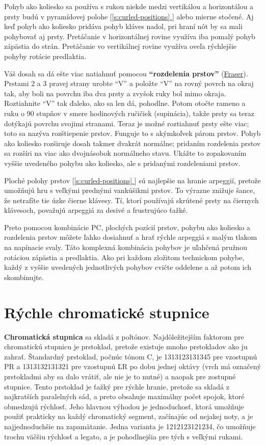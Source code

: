 \documentclass[11pt,a4paper]{book}
\newcommand*{\fullref}[1]{\hyperref[{#1}]{\ref*{#1} \nameref*{#1}}} %
\newcommand*{\fullrefp}[1]{[\fullref{#1}]} %
\begin{document}
Pohyb ako koliesko sa používa s rukou niekde medzi vertikálou a horizontálou a prsty budú v pyramídovej polohe \fullrefp{s:curled-positions} alebo mierne stočené. Aj keď pohyb ako koliesko pridáva pohyb kláves nadol, pri hraní nôt by sa mali pohybovať aj prsty. Pretáčanie v horizontálnej rovine využíva iba pomalý pohyb zápästia do strán. Pretáčanie vo vertikálnej rovine využíva oveľa rýchlejšie pohyby rotácie predlaktia.

Váš dosah sa dá ešte viac natiahnuť pomocou \textbf{“rozdelenia prstov”} (\hyperlink{r:fraser}{Fraser}). Prstami 2 a 3 pravej strany urobte “V” a položte “V” na rovný povrch na okraj tak, aby boli na povrchu iba dva prsty a zvyšok ruky bol mimo okraja. Roztiahnite “V” tak ďaleko, ako sa len dá, pohodlne. Potom otočte rameno a ruku o 90 stupňov v smere hodinových ručičiek (supinácia), takže prsty sa teraz dotýkajú povrchu svojimi stranami. Teraz je možné roztiahnuť prsty ešte viac; toto sa nazýva rozštiepenie prstov. Funguje to s akýmkoľvek párom prstov. Pohyb ako koliesko rozširuje dosah takmer dvakrát normálne; pridaním rozdelenia prstov sa rozšíri na viac ako dvojnásobok normálneho stavu. Ukážte to zopakovaním vyššie uvedeného pohybu ako koliesko, ale s pridanými rozdeleniami prstov.

Ploché polohy prstov \fullrefp{s:curled-positions} sú najlepšie na hranie arpeggií, pretože umožňujú hru s veľkými prednými vankúšikmi prstov. To výrazne znižuje šance, že netrafíte tie úzke čierne klávesy. Tí, ktorí používajú skrútené prsty na čiernych klávesoch, považujú arpeggiá za desivé a frustrujúco ťažké.

Preto pomocou kombinácie PC, plochých pozícií prstov, pohybu ako koliesko a rozdelenia prstov môžete ľahko dosiahnuť a hrať rýchle arpeggiá s malým tlakom na napínacie svaly. Táto komplexná kombinácia pohybov je uľahčená pružnou rotáciou zápästia a predlaktia. Ako pri každom zložitom technickom pohybe, každý z vyššie uvedených jednotlivých pohybov cvičte oddelene a až potom ich skombinujte.

\section{Rýchle chromatické stupnice}\label{s:fast-scales}
\textbf{Chromatická stupnica} sa skladá z poltónov. Najdôležitejším faktorom pre chromatickú stupnicu je prstoklad, pretože existuje mnoho prstokladov ako ju zahrať. Štandardný prstoklad, počnúc tónom C, je 1313123131345 pre vzostupnú PR a 1313132131321 pre vzostupnú ĽR po dobu jednej oktávy (vrch má označený prstokladmi aby sa dalo vrátiť, ale nie je to nutné) a naopak pre zostupné stupnice. Tento prstoklad je ťažký pre rýchle hranie, pretože sa skladá z najkratších paralelných sád, a preto obsahuje maximálny počet spojok, ktoré obmedzujú rýchlosť. Jeho hlavnou výhodou je jednoduchosť, ktorá umožňuje použiť prakticky na každý chromatický segment, začínajúc od nejakej noty, a je najjednoduchšie na zapamätanie. Jedna varianta je 1212123121234, čo umožňuje trochu väčšiu rýchlosť a legato, a je pohodlnejšia pre tých s veľkými rukami.
\end{document}
